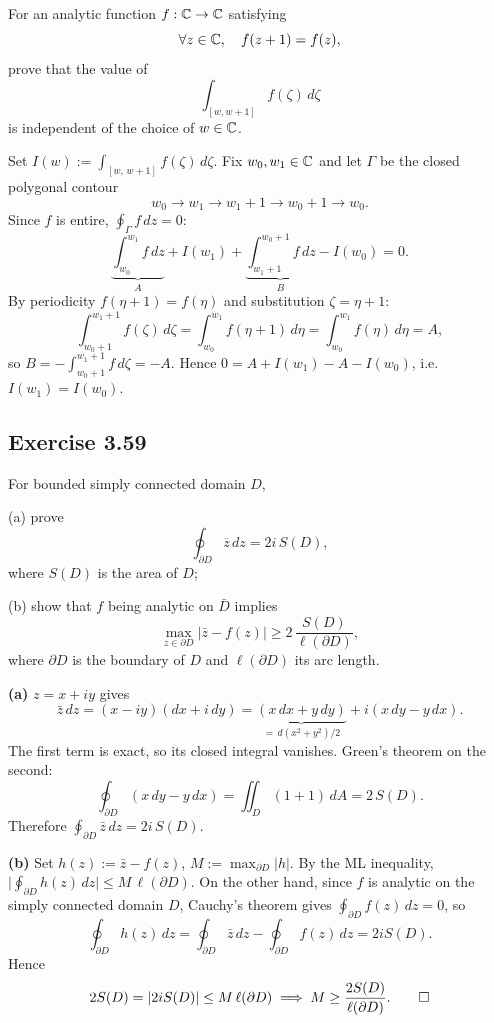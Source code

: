 \documentclass{article}
\begin{document}
For an analytic function $f : \mathbb{C} \to \mathbb{C}$ satisfying
\[
	\forall z\in\mathbb{C},\quad f(z+1)=f(z),
\]
prove that the value of
\[
	\int_{[w,w+1]} f(\zeta)\,d\zeta
\]
is independent of the choice of $w\in\mathbb{C}$.

\begin{solution}
	Set $I(w):=\int_{[w,\,w+1]}f(\zeta)\,d\zeta$.
	Fix $w_0,w_1\in\mathbb{C}$ and let $\Gamma$ be the closed polygonal
	contour
	\[
		w_0\to w_1\to w_1{+}1\to w_0{+}1\to w_0.
	\]
	Since $f$ is entire, $\oint_\Gamma f\,dz=0$:
	\[
		\underbrace{\int_{w_0}^{w_1}f\,dz}_{A}
		+I(w_1)
		+\underbrace{\int_{w_1+1}^{w_0+1}f\,dz}_{B}
		-I(w_0)=0.
	\]
	By periodicity $f(\eta+1)=f(\eta)$ and substitution
	$\zeta=\eta+1$:
	\[
		\int_{w_0+1}^{w_1+1}f(\zeta)\,d\zeta
		=\int_{w_0}^{w_1}f(\eta+1)\,d\eta
		=\int_{w_0}^{w_1}f(\eta)\,d\eta=A,
	\]
	so $B=-\int_{w_0+1}^{w_1+1}f\,d\zeta=-A$.
	Hence $0=A+I(w_1)-A-I(w_0)$, i.e.\ $I(w_1)=I(w_0)$.\qedhere
\end{solution}

\subsection{Exercise 3.59}

For bounded simply connected domain $D$,

(a) prove
\[
	\oint_{\partial D} \overline{z}\,dz = 2i\,S(D),
\]
where $S(D)$ is the area of $D$;

(b) show that $f$ being analytic on $\bar{D}$ implies
\[
	\max_{z\in\partial D} |\bar{z}-f(z)| \ge 2\,\frac{S(D)}{\ell(\partial D)},
\]
where $\partial D$ is the boundary of $D$ and
$\ell(\partial D)$ its arc length.

\begin{solution}
	\textbf{(a)}\;
	$z=x+iy$ gives
	\[
		\bar z\,dz
		=(x-iy)(dx+i\,dy)
		=\underbrace{(x\,dx+y\,dy)}_{=\,d(x^2+y^2)/2}
		+i(x\,dy-y\,dx).
	\]
	The first term is exact, so its closed integral vanishes.
	Green's theorem on the second:
	\[
		\oint_{\partial D}(x\,dy-y\,dx)
		=\iint_D(1+1)\,dA=2\,S(D).
	\]
	Therefore $\oint_{\partial D}\bar z\,dz=2i\,S(D)$.

	\medskip

	\textbf{(b)}\;
	Set $h(z):=\bar z-f(z)$, \;$M:=\max_{\partial D}|h|$.
	By the ML inequality,
	$\displaystyle\biggl|\oint_{\partial D}h(z)\,dz\biggr|
	\le M\,\ell(\partial D).$
	On the other hand, since $f$ is analytic on the simply
	connected domain $D$, Cauchy's theorem gives
	$\oint_{\partial D}f(z)\,dz=0$, so
	\[
		\oint_{\partial D}h(z)\,dz
		=\oint_{\partial D}\bar z\,dz
		-\oint_{\partial D}f(z)\,dz
		=2iS(D).
	\]
	Hence
	\[
		2S(D)=|2iS(D)|\le M\,\ell(\partial D)
		\implies
		M\ge\frac{2S(D)}{\ell(\partial D)}.\qedhere
	\]
\end{solution}
\end{document}
